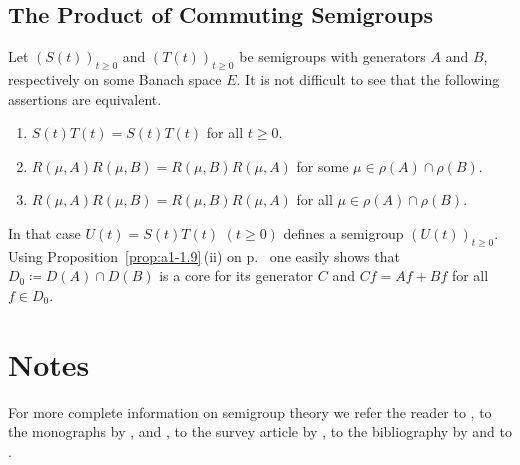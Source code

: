 \subsection{The Product of Commuting Semigroups}\label{subsec:a1-3.9}
Let $(S(t))_{t\geq 0}$ and $(T(t))_{t\geq 0}$ be semigroups with generators $A$ and $B$, respectively on some Banach space $E$.
It is not difficult to see that the following assertions are equivalent.
\begin{enumerate}[\upshape (a)]

\item 
$S(t)T(t) = S(t)T(t)$ for all $t \geq 0$.

\item 
$R(\mu,A)R(\mu,B) = R(\mu,B)R(\mu,A)$ for some $\mu \in \rho(A) \cap \rho(B)$.

\item 
$R(\mu,A)R(\mu,B) = R(\mu,B)R(\mu,A)$ for all $\mu \in \rho(A) \cap \rho(B)$.

\end{enumerate}
In that case $U(t) = S(t)T(t)$ $(t \geq 0)$ defines a semigroup $(U(t))_{t\geq 0}$.
Using %
Proposition~\ref{prop:a1-1.9}\,(ii) on p.~\pageref{prop:a1-1.9} 
one easily shows that $D_{0} \coloneqq D(A) \cap D(B)$ is a core for its generator $C$ and $Cf = Af + Bf$ for all $f \in D_{0}$.

\section*{Notes}

For more complete information on semigroup theory we refer the reader to \citet{hillephillips:1957}, to the monographs by \citet{davies:1980}, 
\citet{goldstein:1985a} and \citet{pazy:1983}, to the survey article by \citet{kreinkhazan:1985}, to the bibliography by 
\citet{goldstein:1985b} and to \citet{engelnagel:2006}.


\RaggedRight

 